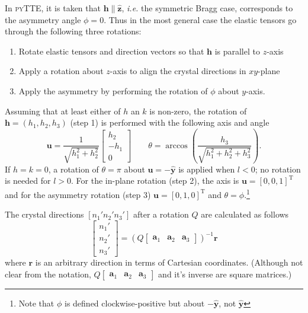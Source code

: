 \documentclass[11pt,a4paper]{article}
\begin{document}
In \textsc{pyTTE}, it is taken that $\mathbf{h} \parallel \hat{\mathbf{z}}$, \emph{i.e.} the symmetric Bragg case, corresponds to the asymmetry angle $\phi=0$. Thus in the most general case the elastic tensors go through the following three rotations:
\begin{enumerate}
\item Rotate elastic tensors and direction vectors so that $\mathbf{h}$ is parallel to $z$-axis
\item Apply a rotation about $z$-axis to align the crystal directions in $xy$-plane
\item Apply the asymmetry by performing the rotation of $\phi$ about $y$-axis.
\end{enumerate}
Assuming that at least either of $h$ an $k$ is non-zero, the rotation of $\mathbf{h}= (h_1,h_2,h_3)$ (step 1) is performed with the following axis and angle
\begin{equation}
\mathbf{u} = \frac{1}{\sqrt{h_1^2 + h_2^2}} \left[\begin{matrix} h_2 \\ -h_1 \\ 0 \end{matrix}\right] \qquad
\theta = \arccos \left( \frac{h_3}{\sqrt{h_1^2 + h_2^2 + h_3^2}} \right).
\end{equation}
If $h=k=0$, a rotation of $\theta = \pi$ about $\mathbf{u} = -\hat{\mathbf{y}}$ is applied when $l<0$; no rotation is needed for $l>0$. For the in-plane rotation (step 2), the axis is $\mathbf{u} = [0,0,1]^{\mathrm{T}}$ and for the asymmetry rotation (step 3) $\mathbf{u} = [0,1,0]^{\mathrm{T}}$ and $\theta = \phi$.\footnote{Note that $\phi$ is defined clockwise-positive but about $-\hat{\mathbf{y}}$, not $\hat{\mathbf{y}}$}

The crystal directions $[n_1' n_2' n_3']$ after a rotation $Q$ are calculated as follows
\begin{equation}
 \left[\begin{matrix} n_1' \\ n_2' \\ n_3' \end{matrix}\right] = 
 (Q \left[\begin{matrix} \mathbf{a}_1 & \mathbf{a}_2 & \mathbf{a}_3 \end{matrix} \right])^{-1} \mathbf{r}
\end{equation}
where $\mathbf{r}$ is an arbitrary direction in terms of Cartesian coordinates. (Although not clear from the notation, $Q \left[\begin{matrix} \mathbf{a}_1 & \mathbf{a}_2 & \mathbf{a}_3 \end{matrix} \right]$ and it's inverse are square matrices.)



\end{document}
